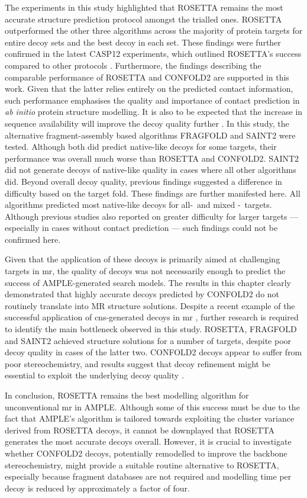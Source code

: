 The experiments in this study highlighted that ROSETTA remains the most accurate structure prediction protocol amongst the trialled ones. ROSETTA outperformed the other three algorithms across the majority of protein targets for entire decoy sets and the best decoy in each set. These findings were further confirmed in the latest CASP12 experiments, which outlined ROSETTA's success compared to other protocols \cite{Ovchinnikov2018-wp,Abriata2018-lu}. Furthermore, the findings describing the comparable performance of ROSETTA and CONFOLD2 \cite{Adhikari2018-lj,Michel2017-xh} are supported in this work. Given that the latter relies entirely on the predicted contact information, such performance emphasises the quality and importance of contact prediction in \textit{ab initio} protein structure modelling. It is also to be expected that the increase in sequence availability will improve the decoy quality further \cite{Abriata2018-lu,Schaarschmidt2018-mh}.  
In this study, the alternative fragment-assembly based algorithms FRAGFOLD and SAINT2 were tested. Although both did predict native-like decoys for some targets, their performance was overall much worse than ROSETTA and CONFOLD2. SAINT2 did not generate decoys of native-like quality in cases where all other algorithms did. Beyond overall decoy quality, previous findings suggested a difference in difficulty based on the target fold. These findings are further manifested here. All algorithms predicted most native-like decoys for all-\textalpha\ and mixed \textalpha-\textbeta\ targets. Although previous studies also reported on greater difficulty for larger targets --- especially in cases without contact prediction --- such findings could not be confirmed here.

Given that the application of these decoys is primarily aimed at challenging targets in \gls{mr}, the quality of decoys was not necessarily enough to predict the success of AMPLE-generated search models. The results in this chapter clearly demonstrated that highly accurate decoys predicted by CONFOLD2 do not routinely translate into MR structure solutions. Despite a recent example of the successful application of \gls{cns}-generated decoys in \gls{mr} \cite{Sjodt2018-zq}, further research is required to identify the main bottleneck observed in this study. ROSETTA, FRAGFOLD and SAINT2 achieved structure solutions for a number of targets, despite poor decoy quality in cases of the latter two. CONFOLD2 decoys appear to suffer from poor stereochemistry, and results suggest that decoy refinement might be essential to exploit the underlying decoy quality \cite{Mao2014-lg}.

In conclusion, ROSETTA remains the best modelling algorithm for unconventional \gls{mr} in AMPLE. Although some of this success must be due to the fact that AMPLE's algorithm is tailored towards exploiting the cluster variance derived from ROSETTA decoys, it cannot be downplayed that ROSETTA generates the most accurate decoys overall. However, it is crucial to investigate whether CONFOLD2 decoys, potentially remodelled to improve the backbone stereochemistry, might provide a suitable routine alternative to ROSETTA, especially because fragment databases are not required and modelling time per decoy is reduced by approximately a factor of four.
